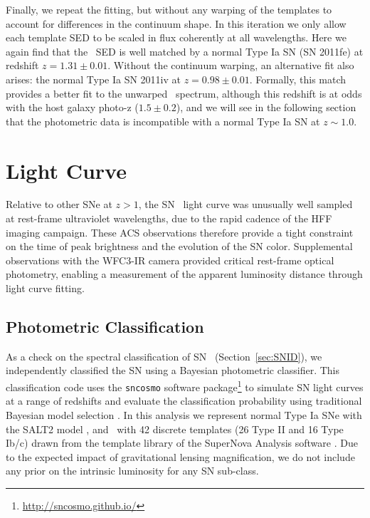 Finally, we repeat the fitting, but without any warping of the
templates to account for differences in the continuum shape.  In this
iteration we only allow each template SED to be scaled in flux
coherently at all wavelengths.  Here we again find that the \tomas\
SED is well matched by a normal Type Ia SN (SN 2011fe) at redshift
$z=1.31\pm0.01$.  Without the continuum warping, an alternative fit
also arises: the normal Type Ia SN 2011iv at
$z=0.98\pm0.01$. Formally, this match provides a better fit to the
unwarped \tomas\ spectrum, although this redshift is at odds with the
host galaxy photo-z ($1.5\pm0.2$), and we will see in the following
section that the photometric data is incompatible with a normal Type
Ia SN at $z\sim1.0$.


\section{Light Curve}
\label{sec:LightCurve}

Relative to other SNe at $z>1$, the SN \tomas\ light curve was
unusually well sampled at rest-frame ultraviolet wavelengths, due to
the rapid cadence of the HFF imaging campaign. These ACS observations
therefore provide a tight constraint on the time of peak brightness
and the evolution of the SN color.  Supplemental observations with the
WFC3-IR camera provided critical rest-frame optical photometry,
enabling a measurement of the apparent luminosity distance through
light curve fitting.

\subsection{Photometric Classification}
\label{sec:PhotometricClassification}

As a check on the spectral classification of SN \tomas\
(Section~\ref{sec:SNID}), we independently classified the SN using a
Bayesian photometric classifier.  This classification code uses the
{\tt sncosmo} software
package\footnote{\url{http://sncosmo.github.io/}} to simulate SN light
curves at a range of redshifts and evaluate the classification
probability using traditional Bayesian model selection \citep[as
in][]{Jones:2013,Rodney:2014,Graur:2014,Rodney:2015}.  In this
analysis we represent normal Type Ia SNe with the SALT2
model \citep{Guy:2010}, and \CCSNe\ with 42 discrete templates (26
Type II and 16 Type Ib/c) drawn from the template library of the
SuperNova Analysis software \citep[SNANA,][]{Kessler:2009a}.  Due to
the expected impact of gravitational lensing magnification, we do not
include any prior on the intrinsic luminosity for any SN sub-class.

